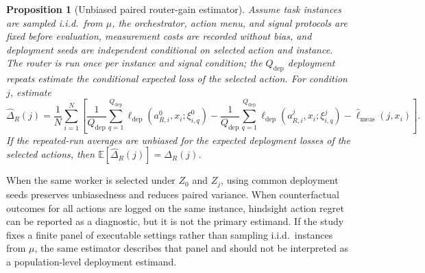 \documentclass{article}
\newtheorem{proposition}{Proposition}
\newcommand{\E}{\mathbb{E}}
\begin{document}
\begin{proposition}[Unbiased paired router-gain estimator]
\label{prop:paired-unbiased}
Assume task instances are sampled i.i.d.\ from $\mu$, the orchestrator, action menu, and signal protocols are fixed before evaluation, measurement costs are recorded without bias, and deployment seeds are independent conditional on selected action and instance.
The router is run once per instance and signal condition; the $Q_{\mathrm{dep}}$ deployment repeats estimate the conditional expected loss of the selected action.
For condition $j$, estimate
\[
\widehat{\Delta}_R(j)
=
\frac{1}{N}\sum_{i=1}^N
\left[
\frac{1}{Q_{\mathrm{dep}}}\sum_{q=1}^{Q_{\mathrm{dep}}}
\ell_{\mathrm{dep}}(a_{R,i}^0,x_i;\xi_{i,q}^{0})
-
\frac{1}{Q_{\mathrm{dep}}}\sum_{q=1}^{Q_{\mathrm{dep}}}
\ell_{\mathrm{dep}}(a_{R,i}^j,x_i;\xi_{i,q}^{j})
-
\widehat{\ell}_{\mathrm{meas}}(j,x_i)
\right].
\]
If the repeated-run averages are unbiased for the expected deployment losses of the selected actions, then
$\E[\widehat{\Delta}_R(j)]=\Delta_R(j)$.
\end{proposition}

When the same worker is selected under $Z_0$ and $Z_j$, using common deployment seeds preserves unbiasedness and reduces paired variance.
When counterfactual outcomes for all actions are logged on the same instance, hindsight action regret can be reported as a diagnostic, but it is not the primary estimand.
If the study fixes a finite panel of executable settings rather than sampling i.i.d.\ instances from $\mu$, the same estimator describes that panel and should not be interpreted as a population-level deployment estimand.
\end{document}

